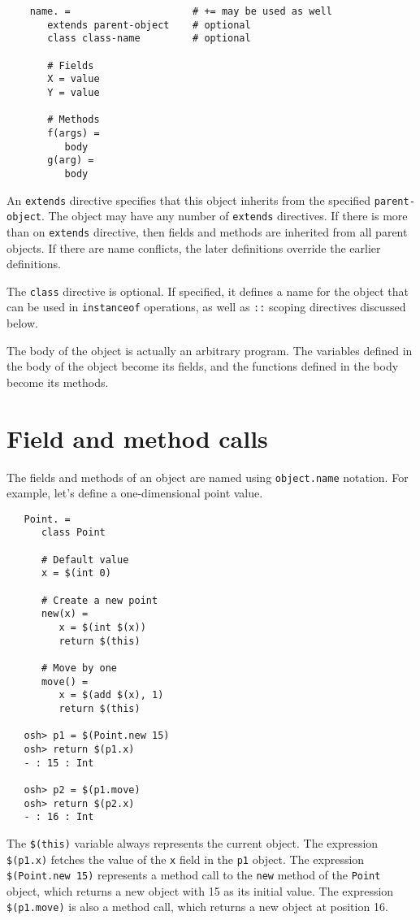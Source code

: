 \begin{verbatim}
    name. =                     # += may be used as well
       extends parent-object    # optional
       class class-name         # optional

       # Fields
       X = value
       Y = value

       # Methods
       f(args) =
          body
       g(arg) =
          body
\end{verbatim}

An \verb+extends+ directive specifies that this object inherits from
the specified \verb+parent-object+.  The object may have any number of
\verb+extends+ directives.  If there is more than on \verb+extends+
directive, then fields and methods are inherited from all parent
objects.  If there are name conflicts, the later definitions override
the earlier definitions.

The \verb+class+ directive is optional.  If specified, it defines a name
for the object that can be used in \verb+instanceof+ operations, as well
as \verb+::+ scoping directives discussed below.

The body of the object is actually an arbitrary program.  The
variables defined in the body of the object become its fields, and the
functions defined in the body become its methods.

\section{Field and method calls}

The fields and methods of an object are named using \verb+object.name+ notation.
For example, let's define a one-dimensional point value.

\begin{verbatim}
   Point. =
      class Point

      # Default value
      x = $(int 0)

      # Create a new point
      new(x) =
         x = $(int $(x))
         return $(this)

      # Move by one
      move() =
         x = $(add $(x), 1)
         return $(this)

   osh> p1 = $(Point.new 15)
   osh> return $(p1.x)
   - : 15 : Int

   osh> p2 = $(p1.move)
   osh> return $(p2.x)
   - : 16 : Int
\end{verbatim}

The \verb+$(this)+ variable always represents the current object.
The expression \verb+$(p1.x)+ fetches the value of the \verb+x+ field
in the \verb+p1+ object.  The expression \verb+$(Point.new 15)+
represents a method call to the \verb+new+ method of the \verb+Point+
object, which returns a new object with 15 as its initial value.  The
expression \verb+$(p1.move)+ is also a method call, which returns a
new object at position 16.

